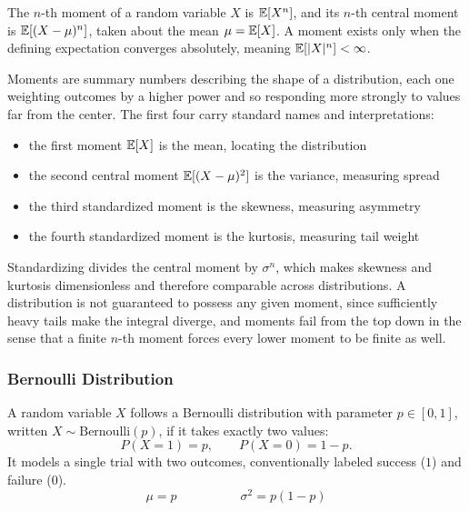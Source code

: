 \begin{definition}[Moment]
The $n$-th moment of a random variable $X$ is $\mathbb{E}[X^n]$, and its $n$-th central moment is $\mathbb{E}[(X - \mu)^n]$, taken about the mean $\mu = \mathbb{E}[X]$. A moment exists only when the defining expectation converges absolutely, meaning $\mathbb{E}[|X|^n] < \infty$.
\end{definition}

Moments are summary numbers describing the shape of a distribution, each one weighting outcomes by a higher power and so responding more strongly to values far from the center. The first four carry standard names and interpretations:
\begin{itemize}[itemsep=-1ex, label=--]
  \item the first moment $\mathbb{E}[X]$ is the mean, locating the distribution
  \item the second central moment $\mathbb{E}[(X-\mu)^2]$ is the variance, measuring spread
  \item the third standardized moment is the skewness, measuring asymmetry
  \item the fourth standardized moment is the kurtosis, measuring tail weight
\end{itemize}
Standardizing divides the central moment by $\sigma^n$, which makes skewness and kurtosis dimensionless and therefore comparable across distributions. A distribution is not guaranteed to possess any given moment, since sufficiently heavy tails make the integral diverge, and moments fail from the top down in the sense that a finite $n$-th moment forces every lower moment to be finite as well.

\subsubsection{Bernoulli Distribution}

\begin{definition}[Bernoulli]
A random variable $X$ follows a Bernoulli distribution with parameter $p \in [0,1]$, written $X \sim \text{Bernoulli}(p)$, if it takes exactly two values:
\[
P(X = 1) = p, \qquad P(X = 0) = 1 - p.
\]
It models a single trial with two outcomes, conventionally labeled success ($1$) and failure ($0$).
\[
\mu = p \hspace{5em} \sigma^2 = p(1-p)
\]
\end{definition}

